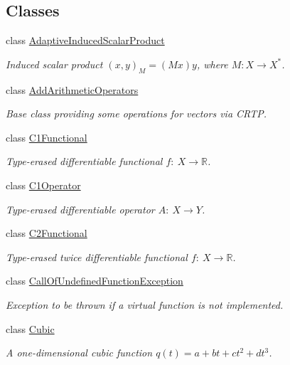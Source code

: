 \subsection*{Classes}
\begin{DoxyCompactItemize}
\item 
class \hyperlink{classSpacy_1_1AdaptiveInducedScalarProduct}{Adaptive\+Induced\+Scalar\+Product}
\begin{DoxyCompactList}\small\item\em Induced scalar product $(x,y)_M = (Mx)y$, where $M:X\rightarrow X^*$. \end{DoxyCompactList}\item 
class \hyperlink{classSpacy_1_1AddArithmeticOperators}{Add\+Arithmetic\+Operators}
\begin{DoxyCompactList}\small\item\em Base class providing some operations for vectors via C\+R\+TP. \end{DoxyCompactList}\item 
class \hyperlink{classSpacy_1_1C1Functional}{C1\+Functional}
\begin{DoxyCompactList}\small\item\em Type-\/erased differentiable functional $f:\ X \to \mathbb{R} $. \end{DoxyCompactList}\item 
class \hyperlink{classSpacy_1_1C1Operator}{C1\+Operator}
\begin{DoxyCompactList}\small\item\em Type-\/erased differentiable operator $A:\ X \to Y $. \end{DoxyCompactList}\item 
class \hyperlink{classSpacy_1_1C2Functional}{C2\+Functional}
\begin{DoxyCompactList}\small\item\em Type-\/erased twice differentiable functional $f:\ X \to \mathbb{R} $. \end{DoxyCompactList}\item 
class \hyperlink{classSpacy_1_1CallOfUndefinedFunctionException}{Call\+Of\+Undefined\+Function\+Exception}
\begin{DoxyCompactList}\small\item\em Exception to be thrown if a virtual function is not implemented. \end{DoxyCompactList}\item 
class \hyperlink{classSpacy_1_1Cubic}{Cubic}
\begin{DoxyCompactList}\small\item\em A one-\/dimensional cubic function $q(t) = a + bt + ct^2 + dt^3$. \end{DoxyCompactList}\item 

\end{DoxyCompactItemize}

